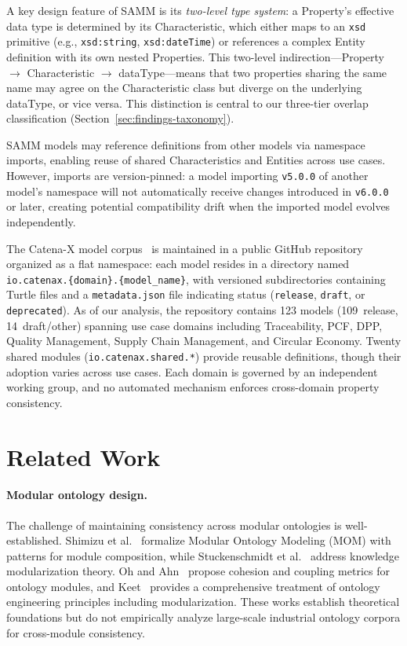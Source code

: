 \documentclass[]{ceurart}
\begin{document}
A key design feature of SAMM is its \emph{two-level type system}: a
Property's effective data type is determined by its Characteristic, which
either maps to an \texttt{xsd} primitive (e.g., \texttt{xsd:string},
\texttt{xsd:dateTime}) or references a complex Entity definition with its
own nested Properties. This two-level indirection---Property $\to$
Characteristic $\to$ dataType---means that two properties sharing the same
name may agree on the Characteristic class but diverge on the underlying
dataType, or vice versa. This distinction is central to our three-tier
overlap classification (Section~\ref{sec:findings-taxonomy}).

SAMM models may reference definitions from other models via namespace
imports, enabling reuse of shared Characteristics and Entities across use
cases. However, imports are version-pinned: a model importing
\texttt{v5.0.0} of another model's namespace will not automatically receive
changes introduced in \texttt{v6.0.0} or later, creating potential
compatibility drift when the imported model evolves independently.

The Catena-X model corpus~\cite{catenax2024models} is maintained in a public
GitHub repository organized as a flat namespace: each model resides in a
directory named \texttt{io.catenax.\{domain\}.\allowbreak\{model\_name\}},
with versioned subdirectories containing Turtle files and a
\texttt{metadata.json} file indicating status (\texttt{release},
\texttt{draft}, or \texttt{deprecated}). As of our analysis, the repository
contains 123 models (109~release, 14~draft/other) spanning use case domains
including Traceability, PCF, DPP, Quality Management, Supply Chain
Management, and Circular Economy. Twenty shared modules
(\texttt{io.catenax.shared.*}) provide reusable definitions, though their
adoption varies across use cases. Each domain is governed by an independent
working group, and no automated mechanism enforces cross-domain property
consistency.

\section{Related Work}\label{sec:related-work}

\paragraph{Modular ontology design.}
The challenge of maintaining consistency across modular ontologies is
well-established. Shimizu et al.~\cite{shimizu2023modular} formalize
Modular Ontology Modeling (MOM) with patterns for module composition,
while Stuckenschmidt et al.~\cite{stuckenschmidt2009modular} address
knowledge modularization theory. Oh and Ahn~\cite{oh2009ontology}
propose cohesion and coupling metrics for ontology modules, and
Keet~\cite{keet2023modular} provides a comprehensive treatment of
ontology engineering principles including modularization. These works
establish theoretical foundations but do not empirically analyze
large-scale industrial ontology corpora for cross-module consistency.
\end{document}
